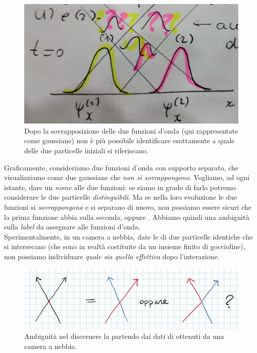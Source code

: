 \documentclass[../../FisicaTeorica.tex]{subfiles}
\begin{document}
\begin{figure}[H]
\centering
\includegraphics[scale=0.5]{Immagini/12_12/image001.jpg}
\caption{Dopo la sovrapposizione delle due funzioni d'onda (qui rappresentate come gaussiane) non è più possibile identificare esattamente a quale delle due particelle iniziali si riferiscano.}
\end{figure}
Graficamente, consideriamo due funzioni d'onda con supporto separato, che visualizziamo come due gaussiane che \textit{non si sovrappongono}. Vogliamo, ad ogni istante, dare un \textit{nome} alle due funzioni: se siamo in grado di farlo potremo considerare le due particelle \textit{distinguibili}. Ma se nella loro evoluzione le due funzioni si \textit{sovrappongono} e si separano di nuovo, non possiamo essere sicuri che la prima funzione abbia  sulla seconda, oppure . Abbiamo quindi una ambiguità sulla \textit{label} da assegnare alle funzioni d'onda.\\

Sperimentalmente, in un camera a nebbia, date le  di due particelle identiche che si intersecano (che sono in realtà costituite da un insieme finito di goccioline), non possiamo individuare \textit{quale  sia quella effettiva} dopo l'interazione.

\begin{figure}[H]
\centering
\includegraphics[scale=0.5]{Immagini/12_12/image002.jpg}
\caption{Ambiguità nel discernere la  partendo dai dati di  ottenuti da una camera a nebbia.}
\end{figure}
\end{document}
